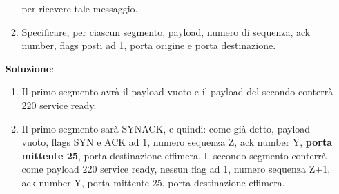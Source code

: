 \documentclass[11pt,a4paper,oneside]{book}
\theoremstyle{definition}
\begin{document}
\begin{enumerate}
\begin{enumerate}
		            per ricevere tale messaggio.
		      \item Specificare, per ciascun segmento, payload,
		            numero di sequenza, ack number, flags posti ad 1,
		            porta origine e porta destinazione.
	      \end{enumerate}
	      \textbf{Soluzione}:
	      \begin{enumerate}
		      \item Il primo segmento avrà il payload vuoto e il payload del secondo conterrà 220 service ready.
		      \item Il primo segmento sarà SYNACK, e quindi: come già detto, payload vuoto, flags SYN e ACK ad 1, numero sequenza Z, ack number Y, \textbf{porta mittente 25}, porta destinazione effimera. Il secondo segmento conterrà come payload 220 service ready, nessun flag ad 1, numero sequenza Z+1, ack number Y, porta	mittente 25, porta destinazione effimera.
	      \end{enumerate}

	      \pagebreak


\end{enumerate}
\end{document}
